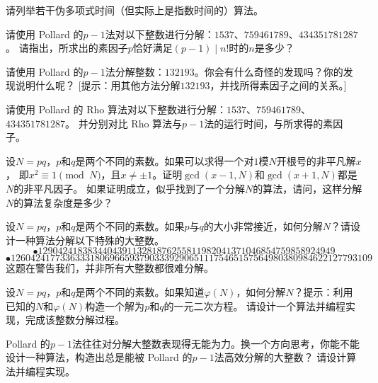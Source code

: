 \begin{problemset}
\item 请列举若干伪多项式时间（但实际上是指数时间的）算法。

\item 请使用 Pollard 的$p - 1$法对以下整数进行分解：$1537$、$759461789$、$434351781287$。
请指出，所求出的素因子$p$恰好满足$(p-1) \mid n!$时的$n$是多少？

\item 请使用 Pollard 的$p - 1$法分解整数：$132193$。你会有什么奇怪的发现吗？你的发现说明什么呢？
[提示：用其他方法分解$132193$，并找所得素因子之间的关系。]

\item 请使用 Pollard 的 Rho 算法对以下整数进行分解：$1537$、$759461789$、$434351781287$。
并分别对比 Rho 算法与$p-1$法的运行时间，与所求得的素因子。

\item 设$N = pq$，$p$和$q$是两个不同的素数。如果可以求得一个对$1$模$N$开根号的非平凡解$x$，
即$x^2 \equiv 1 \pmod{N}$，且$x \neq \pm 1$。证明$\gcd(x -1 , N)$和$\gcd(x + 1, N)$都是$N$的非平凡因子。
如果证明成立，似乎找到了一个分解$N$的算法，请问，这样分解$N$的算法复杂度是多少？

\item 设$N = pq$，$p$和$q$是两个不同的素数。如果$p$与$q$的大小非常接近，如何分解$N$？请设计一种算法分解以下特殊的大整数。
\[\bullet 129042418383440439113281876255811982041371046854759858924949\]
\[\bullet 1260424177336333180696659379033392906511175465157564980380984622127793109\]
\noindent 这题在警告我们，并非所有大整数都很难分解。

\item 设$N = pq$，$p$和$q$是两个不同的素数。如果知道$\varphi(N)$，如何分解$N$？提示：利用已知的$N$和$\varphi(N)$构造一个解为$p$和$q$的一元二次方程。
请设计一个算法并编程实现，完成该整数分解过程。

\item Pollard 的$p - 1$法往往对分解大整数表现得无能为力。换一个方向思考，你能不能设计一种算法，构造出总是能被 Pollard 的$p - 1$法高效分解的大整数？
请设计算法并编程实现。
\end{problemset}
